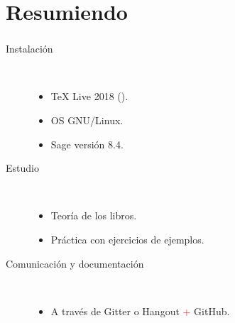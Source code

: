 \section{Resumiendo}
\begin{frame}[c]\frametitle{\insertsection}
\begin{description}
\item[Instalación] \hfill\\
\begin{itemize}
	\item \TeX{} Live 2018 (\arara).
	\item OS GNU/Linux.
	\item Sage versión 8.4.
\end{itemize}

\item[Estudio]\hfill\\
\begin{itemize}
	\item Teoría de los libros.
	\item Práctica con ejercicios de ejemplos.
\end{itemize}

\item[Comunicación y documentación]\hfill\\
\begin{itemize}
	\item A través de Gitter o Hangout \textcolor{red}{+} GitHub.
\end{itemize}
\end{description}

\end{frame}